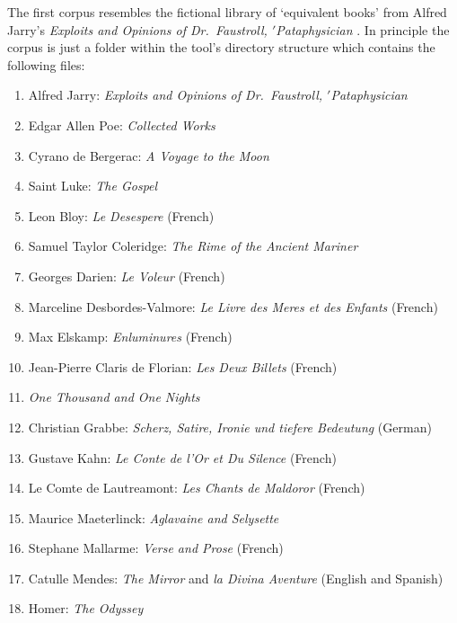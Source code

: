 The first corpus resembles the fictional library of `equivalent books' from Alfred Jarry's \textit{Exploits and Opinions of Dr.\ Faustroll, $'$Pataphysician} \citeyear{Jarry1996}. In principle the corpus is just a folder within the tool's directory structure which contains the following files:


\begin{enumerate}[start=0]
\item Alfred Jarry: \textit{Exploits and Opinions of Dr.\ Faustroll, $'$Pataphysician}
\item Edgar Allen Poe: \textit{Collected Works}
\item Cyrano de Bergerac: \textit{A Voyage to the Moon}
\item Saint Luke: \textit{The Gospel}
\item Leon Bloy: \textit{Le Desespere} (French)
\item Samuel Taylor Coleridge: \textit{The Rime of the Ancient Mariner}
\item Georges Darien: \textit{Le Voleur} (French)
\item Marceline Desbordes-Valmore: \textit{Le Livre des Meres et des Enfants} (French)
\item Max Elskamp: \textit{Enluminures} (French)
\item Jean-Pierre Claris de Florian: \textit{Les Deux Billets} (French)
\item \textit{One Thousand and One Nights}
\item Christian Grabbe: \textit{Scherz, Satire, Ironie und tiefere Bedeutung} (German)
\item Gustave Kahn: \textit{Le Conte de l'Or et Du Silence} (French)
\item Le Comte de Lautreamont: \textit{Les Chants de Maldoror} (French)
\item Maurice Maeterlinck: \textit{Aglavaine and Selysette}
\item Stephane Mallarme: \textit{Verse and Prose} (French)
\item Catulle Mendes: \textit{The Mirror} and \textit{la Divina Aventure} (English and Spanish)
\item Homer: \textit{The Odyssey}

\end{enumerate}
